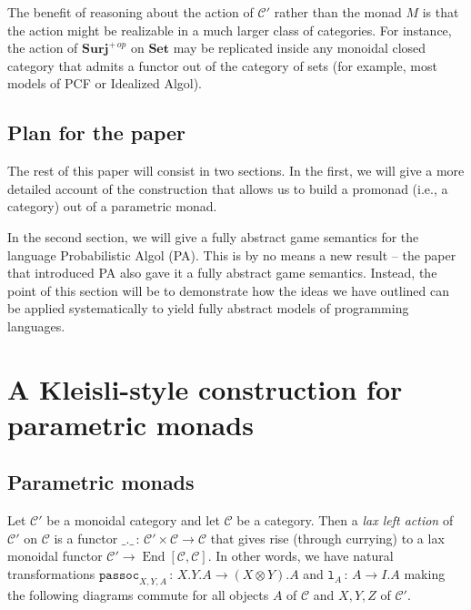 \documentclass{svproc}
\newcommand\C{\mathcal{C}}
\newcommand\from{\,\colon\,}
\DeclareMathOperator{\End}{End}
\newcommand{\passoc}{\texttt{passoc}}
\newcommand\tensor\otimes
\newcommand\lun{\texttt{l}}
\newcommand{\catname}[1]{\mathbf{#1}}
\newcommand{\Set}{\catname{Set}}
\newcommand{\Surj}{\catname{Surj}}
\begin{document}
The benefit of reasoning about the action of $\C'$ rather than the monad $M$ is that the action might be realizable in a much larger class of categories.  
For instance, the action of $\Surj^{+\,op}$ on $\Set$ may be replicated inside any monoidal closed category that admits a functor out of the category of sets (for example, most models of PCF or Idealized Algol).

\subsection{Plan for the paper}

The rest of this paper will consist in two sections.  
In the first, we will give a more detailed account of the construction that allows us to build a promonad (i.e., a category) out of a parametric monad.  

In the second section, we will give a fully abstract game semantics for the language Probabilistic Algol (PA).  
This is by no means a new result -- the paper \cite{DanosHarmer} that introduced PA also gave it a fully abstract game semantics.  
Instead, the point of this section will be to demonstrate how the ideas we have outlined can be applied systematically to yield fully abstract models of programming languages.

\section{A Kleisli-style construction for parametric monads}

\subsection{Parametric monads}

Let $\C'$ be a monoidal category and let $\C$ be a category.  
Then a \emph{lax left action} of $\C'$ on $\C$ is a functor $\_.\_\from \C'\times\C\to \C$ that gives rise (through currying) to a lax monoidal functor $\C'\to \End[\C,\C]$.  
In other words, we have natural transformations $\passoc_{X,Y,A}\from X.Y.A\to (X\tensor Y).A$ and $\lun_A\from A \to I.A$ making the following diagrams commute for all objects $A$ of $\C$ and $X,Y,Z$ of $\C'$.
\end{document}
